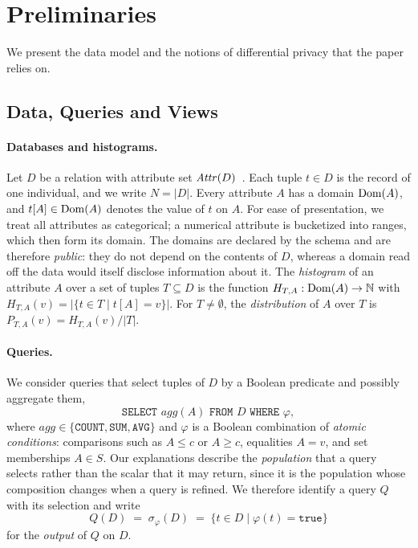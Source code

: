 % 
\section{Preliminaries}
\label{sec:preliminaries}

We present the data model and the notions of differential privacy that the paper relies on.

\subsection{Data, Queries and Views}
\label{subsec:prelim-db-queries}

\paragraph{Databases and histograms.}
Let $D$ be a relation with attribute set $\mathit{Attr}(D)$~\cite{Foundations}.
Each tuple $t\in D$ is the record of one individual, and we write $N=|D|$.
Every attribute $A$ has a domain $\operatorname{Dom}(A)$, and $t[A]\in\operatorname{Dom}(A)$ denotes the value of $t$ on $A$.
For ease of presentation, we treat all attributes as categorical; a numerical attribute is bucketized into ranges, which then form its domain.
The domains are declared by the schema and are therefore \emph{public}: they do not depend on the contents of $D$, whereas a domain read off the data would itself disclose information about it. The \emph{histogram} of an attribute $A$ over a set of tuples $T\subseteq D$ is the function $H_{T,A}:\operatorname{Dom}(A)\rightarrow\mathbb{N}$ with $H_{T,A}(v)=|\{t\in T \mid t[A]=v\}|$. For $T \neq \emptyset$, the \emph{distribution} of $A$ over $T$ is
$P_{T,A}(v) = H_{T,A}(v)/|T|$.


\paragraph{Queries.}
We consider queries that select tuples of $D$ by a Boolean predicate and possibly aggregate them,
\[
\texttt{SELECT } agg(A)
\texttt{ FROM } D
\texttt{ WHERE } \varphi ,
\]
where $agg \in \{\texttt{COUNT},\texttt{SUM},\texttt{AVG}\}$ and $\varphi$ is a Boolean combination of \emph{atomic conditions}: comparisons such as $A \leq c$ or $A \geq c$, equalities $A = v$, and set memberships $A \in S$.
Our explanations describe the \emph{population} that a query selects rather than the scalar that it may return, since it is the population whose composition changes when a query is refined.
We therefore identify a query $Q$ with its selection and write
\[
Q(D) \;=\; \sigma_{\varphi}(D) \;=\; \{t \in D \mid \varphi(t)=\texttt{true}\}
\]
for the \emph{output} of $Q$ on $D$.

